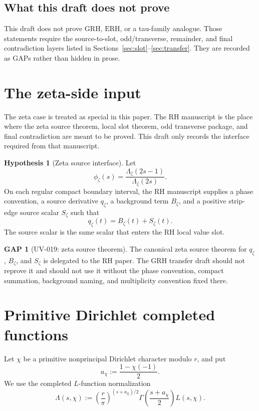 \documentclass[11pt,a4paper]{amsart}
\theoremstyle{plain}
\theoremstyle{definition}
\newtheorem{hypothesis}[theorem]{Hypothesis}
\newtheorem{gap}[theorem]{GAP}
\newcommand{\GRH}{\mathrm{GRH}}
\newcommand{\ERH}{\mathrm{ERH}}
\begin{document}
\subsection{What this draft does not prove}

This draft does not prove \(\GRH\), \(\ERH\), or a tau-family analogue.  Those
statements require the source-to-slot, odd/transverse, remainder, and final
contradiction layers listed in Sections~\ref{sec:slot}--\ref{sec:transfer}.
They are recorded as GAPs rather than hidden in prose.

\section{The zeta-side input}
\label{sec:zeta-input}

The zeta case is treated as special in this paper.  The RH manuscript is the
place where the zeta source theorem, local slot theorem, odd transverse
package, and final contradiction are meant to be proved.  This draft only
records the interface required from that manuscript.

\begin{hypothesis}[Zeta source interface]
\label{hyp:zeta-source}
Let
\[
  \phi_\zeta(s)=\frac{\Lambda_\zeta(2s-1)}{\Lambda_\zeta(2s)}.
\]
On each regular compact boundary interval, the RH manuscript supplies a
phase convention, a source derivative \(q_\zeta\), a background term
\(B_\zeta\), and a positive strip-edge source scalar \(S_\zeta\) such that
\[
  q_\zeta(t)=B_\zeta(t)+S_\zeta(t).
\]
The source scalar is the same scalar that enters the RH local value slot.
\end{hypothesis}

\begin{gap}[UV-019: zeta source theorem]
\label{gap:zeta-source}
The canonical zeta source theorem for \(q_\zeta\), \(B_\zeta\), and
\(S_\zeta\) is delegated to the RH paper.  The GRH transfer draft should not
reprove it and should not use it without the phase convention, compact
summation, background naming, and multiplicity convention fixed there.
\end{gap}

\section{Primitive Dirichlet completed functions}
\label{sec:dirichlet-input}

Let \(\chi\) be a primitive nonprincipal Dirichlet character modulo \(r\), and
put
\[
  a_\chi:=\frac{1-\chi(-1)}{2}.
\]
We use the completed \(L\)-function normalization
\[
  \Lambda(s,\chi)
  :=
  \left(\frac{r}{\pi}\right)^{(s+a_\chi)/2}
  \Gamma\!\left(\frac{s+a_\chi}{2}\right)L(s,\chi).
\]
\end{document}
